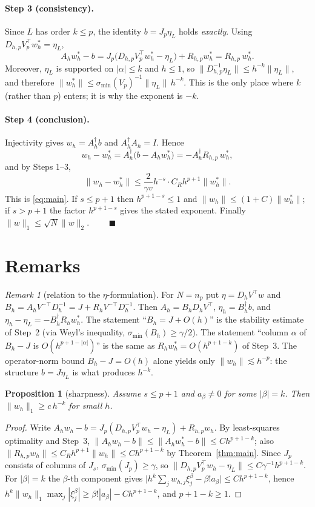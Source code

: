 \documentclass[11pt]{article}
\newcommand{\norm}[1]{\lVert #1\rVert}
\newcommand{\smin}{\sigma_{\min}}
\newcommand{\pinv}{\dagger}
\theoremstyle{plain}
\newtheorem{proposition}[theorem]{Proposition}
\theoremstyle{definition}
\theoremstyle{remark}
\newtheorem{remark}{Remark}
\begin{document}
\paragraph{Step 3 (consistency).}
Since $L$ has order $k\le p$, the identity $b=J_p\eta_L$ holds \emph{exactly}.
Using $D_{h,p}V_p^\top w_h^*=\eta_L$,
\[
A_hw_h^*-b=J_p\big(D_{h,p}V_p^\top w_h^*-\eta_L\big)+R_{h,p}w_h^*=R_{h,p}\,w_h^* .
\]
Moreover, $\eta_L$ is supported on $|\alpha|\le k$ and $h\le1$, so $\norm{D_{h,p}^{-1}\eta_L}\le h^{-k}\norm{\eta_L}$, and therefore
$\norm{w_h^*}\le \smin(V_p)^{-1}\norm{\eta_L}\,h^{-k}$.
This is the only place where $k$ (rather than $p$) enters; it is why the exponent is $-k$.

\paragraph{Step 4 (conclusion).}
Injectivity gives $w_h=A_h^\pinv b$ and $A_h^\pinv A_h=I$. Hence
\[
w_h-w_h^*=A_h^\pinv\big(b-A_hw_h^*\big)=-A_h^\pinv R_{h,p}\,w_h^*,
\]
and by Steps 1--3,
\[
\norm{w_h-w_h^*}\le\frac{2}{\gamma v}h^{-s}\cdot C_Rh^{p+1}\norm{w_h^*}.
\]
This is \eqref{eq:main}. If $s\le p+1$ then $h^{p+1-s}\le1$ and $\norm{w_h}\le(1+C)\norm{w_h^*}$; if $s>p+1$ the factor $h^{p+1-s}$ gives the stated exponent. Finally $\norm w_1\le\sqrt N\norm w_2$. \hfill$\qquad\blacksquare$

\section{Remarks}

\begin{remark}[relation to the $\eta$-formulation]
For $N=n_p$ put $\eta=D_hV^\top w$ and $B_h=A_hV^{-\top}D_h^{-1}=J+R_hV^{-\top}D_h^{-1}$. Then $A_h=B_hD_hV^\top$, $\eta_h=B_h^\pinv b$, and $\eta_h-\eta_L=-B_h^\pinv R_hw_h^*$.
The statement ``$B_h=J+O(h)$'' is the stability estimate of Step~2 (via Weyl's inequality, $\smin(B_h)\ge\gamma/2$).
The statement ``column $\alpha$ of $B_h-J$ is $O(h^{p+1-|\alpha|})$'' is the same as $R_hw_h^*=O(h^{p+1-k})$ of Step~3.
The operator-norm bound $B_h-J=O(h)$ alone yields only $\norm{w_h}\lesssim h^{-p}$: the structure $b=J\eta_L$ is what produces $h^{-k}$.
\end{remark}

\begin{proposition}[sharpness]\label{prop:sharp}
Assume $s\le p+1$ and $a_\beta\ne0$ for some $|\beta|=k$. Then $\norm{w_h}_1\ge c\,h^{-k}$ for small $h$.
\end{proposition}
\begin{proof}
Write $A_hw_h-b=J_p(D_{h,p}V_p^\top w_h-\eta_L)+R_{h,p}w_h$. By least-squares optimality and Step~3, $\norm{A_hw_h-b}\le\norm{A_hw_h^*-b}\le C h^{p+1-k}$; also $\norm{R_{h,p}w_h}\le C_Rh^{p+1}\norm{w_h}\le Ch^{p+1-k}$ by Theorem~\ref{thm:main}.
Since $J_p$ consists of columns of $J_s$, $\smin(J_p)\ge\gamma$, so $\norm{D_{h,p}V_p^\top w_h-\eta_L}\le C\gamma^{-1}h^{p+1-k}$.
For $|\beta|=k$ the $\beta$-th component gives $\big|h^k\sum_j w_{h,j}\xi_j^\beta-\beta!a_\beta\big|\le C h^{p+1-k}$, hence
$h^k\norm{w_h}_1\max_j|\xi_j^\beta|\ge\beta!|a_\beta|-Ch^{p+1-k}$, and $p+1-k\ge1$.
\end{proof}
\end{document}
